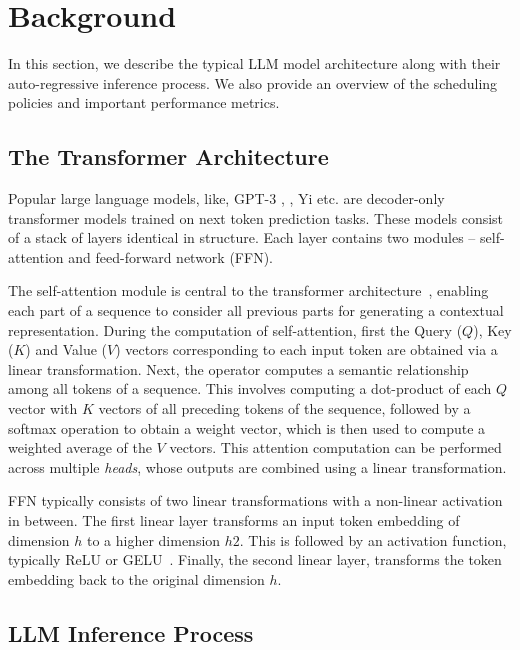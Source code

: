 \section{Background}
\label{sec:background}

In this section, we describe the typical LLM model architecture along with their auto-regressive inference process. We also provide an overview of the scheduling policies and important performance metrics.

\subsection{The Transformer Architecture}
\label{sec:background:llm-architecure}

Popular large language models, like, GPT-3 \cite{gpt3}, \llama \cite{touvron2023llama}, Yi \cite{yi} etc. are decoder-only transformer models trained on next token prediction tasks. These models consist of a stack of layers identical in structure. Each layer contains two modules -- self-attention and feed-forward network (FFN).


 The self-attention module is central to the transformer architecture~\cite{attentionpaper}, enabling each part of a sequence to consider all previous parts for generating a contextual representation. During the computation of self-attention, first the Query ($Q$), Key ($K$) and Value ($V$) vectors corresponding to each input token are obtained via a linear transformation. Next, the \attn operator computes a semantic relationship among all tokens of a sequence. This involves computing a dot-product of each $Q$ vector with $K$ vectors of all preceding tokens of the sequence, followed by a softmax operation to obtain a weight vector, which is then used to compute a weighted average of the $V$ vectors. This attention computation can be performed across multiple \textit{heads}, whose outputs are combined using a linear transformation. 

 FFN typically consists of two linear transformations with a non-linear activation in between. The first linear layer transforms an input token embedding of dimension $h$ to a higher dimension $h2$. This is followed by an activation function, typically ReLU or GELU~\cite{relu2019,gelu2023}. Finally, the second linear layer, transforms the token embedding back to the original dimension $h$.


\subsection{LLM Inference Process}
\label{sec:background:inference-process}

